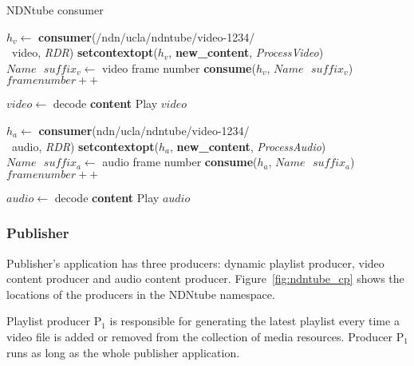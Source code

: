 \begin{algorithm}[ht]
\caption{NDNtube consumer}
\label{alg:recordconsumer}
\begin{algorithmic}[4]
\State $h_v \leftarrow $ \textbf{consumer}(/ndn/ucla/ndntube/video-1234/ \\\ video, \textit{RDR})
\State \textbf{setcontextopt}($h_v$, \textbf{new\_content}, \textit{ProcessVideo})
\vspace{0.2cm}
	\State $Name \textbf{ } suffix_v \leftarrow $ video frame number
	\State \textbf{consume}($h_v$, $Name\textbf{ }suffix_v$)
	\State $framenumber ++$
	\EndWhile
\vspace{0.2cm}

   \State $video \leftarrow $ decode \textbf{content}
   \State Play $video$
\EndFunction

\vspace{0.4cm}

\State $h_a \leftarrow $ \textbf{consumer}(ndn/ucla/ndntube/video-1234/ \\\ audio, \textit{RDR})
\State \textbf{setcontextopt}($h_a$, \textbf{new\_content}, \textit{ProcessAudio})
\vspace{0.2cm}
	\State $Name \textbf{ } suffix_a \leftarrow $ audio frame number
	\State \textbf{consume}($h_a$, $Name\textbf{ }suffix_a$)
	\State $framenumber ++$
	\EndWhile
\vspace{0.2cm}

   	\State $audio \leftarrow $ decode \textbf{content}
   	\State Play $audio$
\EndFunction
\end{algorithmic}
\end{algorithm}

\subsubsection{Publisher}
Publisher's application has three producers: dynamic playlist producer, video content producer and audio content producer. Figure~\ref{fig:ndntube_cp} shows the locations of the producers in the NDNtube namespace.

Playlist producer P$_{\text{1}}$ is responsible for generating the latest playlist every time a video file is added or removed from the collection of media resources. Producer P$_{\text{1}}$ runs as long as the whole publisher application.

